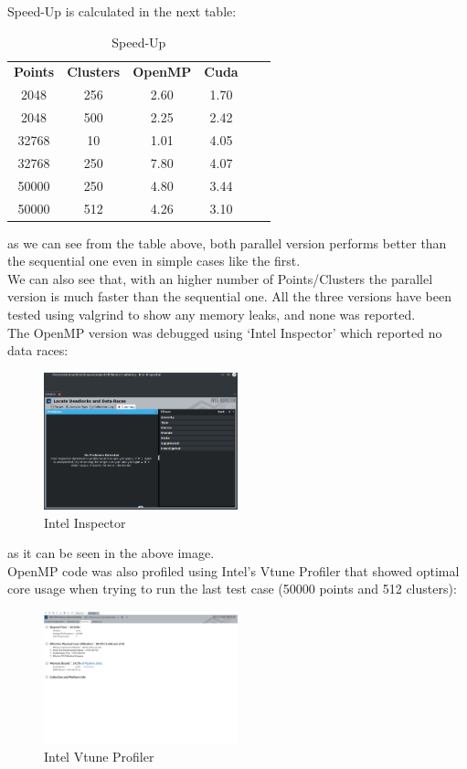 \documentclass[10pt,twocolumn,letterpaper]{article}
\begin{document}
Speed-Up is calculated in the next table:\\
\begin{table}[H]
\centering
\begin{tabular}{@{}cccccc@{}}
\textbf{Points} & \textbf{Clusters} & \textbf{OpenMP} & \textbf{Cuda} \\
2048 & 256 & 2.60 & 1.70 \\
2048 & 500 & 2.25 & 2.42\\
32768 & 10 & 1.01 & 4.05 \\
32768 & 250 & 7.80 & 4.07 \\
50000 & 250 & 4.80 & 3.44 \\
50000 & 512 & 4.26 & 3.10 \\
\end{tabular}
\caption{Speed-Up}
\end{table}
as we can see from the table above, both parallel version performs better than the sequential one even in simple cases like the 
first.\\
We can also see that, with an higher number of Points/Clusters the parallel version is much faster than the sequential one.
All the three versions have been tested using valgrind to show any memory leaks, and none was reported.\\
The OpenMP version was debugged using `Intel Inspector' which reported no data races:\\
\begin{figure}[H]
\centering
\includegraphics[width=0.5\textwidth]{OpenMP_Inspector}
\caption{Intel Inspector}
\end{figure}
as it can be seen in the above image.\\
OpenMP code was also profiled using Intel's Vtune Profiler that showed optimal core usage when trying to run the last test case
(50000 points and 512 clusters):\\
\begin{figure}[H]
\centering
\includegraphics[width=0.5\textwidth]{OpenMP_Vtune_Profiler}
\caption{Intel Vtune Profiler}
\end{figure}
\end{document}
